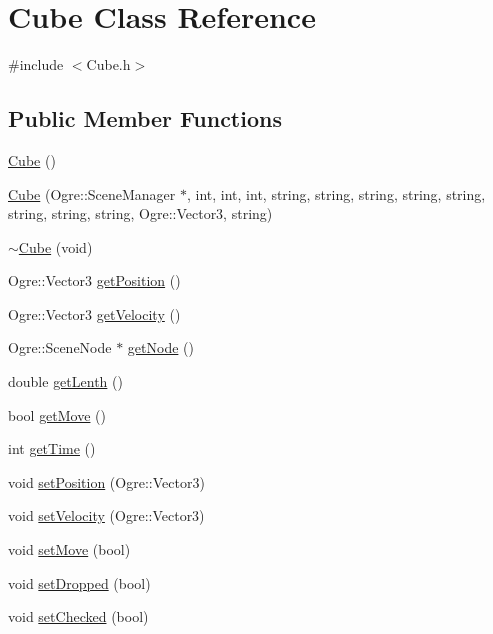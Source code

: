 \hypertarget{class_cube}{\section{Cube Class Reference}
\label{class_cube}
}


{\ttfamily \#include $<$Cube.\-h$>$}

\subsection*{Public Member Functions}
\begin{DoxyCompactItemize}
\item 
\hyperlink{class_cube_a06f3d86fb63e3aad08623610aa3c17b4}{Cube} ()
\item 
\hyperlink{class_cube_a3ec51b94edaa94dbca4c046dd453bc4b}{Cube} (Ogre\-::\-Scene\-Manager $\ast$, int, int, int, string, string, string, string, string, string, string, string, Ogre\-::\-Vector3, string)
\item 
\hyperlink{class_cube_aefa3ddc37d7821a10ab957420a710825}{$\sim$\-Cube} (void)
\item 
Ogre\-::\-Vector3 \hyperlink{class_cube_a0d9a7171dcd690a6117722ca99228874}{get\-Position} ()
\item 
Ogre\-::\-Vector3 \hyperlink{class_cube_a28d8dc5869f764e90af8d1ab6620ecc2}{get\-Velocity} ()
\item 
Ogre\-::\-Scene\-Node $\ast$ \hyperlink{class_cube_ae9e042cff4a069eebdeeec8e4802c7e0}{get\-Node} ()
\item 
double \hyperlink{class_cube_a9aee61f49c404b77e099097ee7329847}{get\-Lenth} ()
\item 
bool \hyperlink{class_cube_aacb284350c61df3f4fee2e59bb5abed9}{get\-Move} ()
\item 
int \hyperlink{class_cube_af947cc43bfdf7f35113c47d1cb6b9d95}{get\-Time} ()
\item 
void \hyperlink{class_cube_a8dbf7f850b052fe2071051dddcd84132}{set\-Position} (Ogre\-::\-Vector3)
\item 
void \hyperlink{class_cube_af4059a96c2aa6a770cdc3d6c74ddf7a2}{set\-Velocity} (Ogre\-::\-Vector3)
\item 
void \hyperlink{class_cube_a129e4d71a83c87fd5f2c9c38437793e2}{set\-Move} (bool)
\item 
void \hyperlink{class_cube_ac58b3288f0acf82a2fbbb70ce3f488e1}{set\-Dropped} (bool)
\item 
void \hyperlink{class_cube_a1c162b47044ad0f3f0e8590e1ebbafb1}{set\-Checked} (bool)

\end{DoxyCompactItemize}
